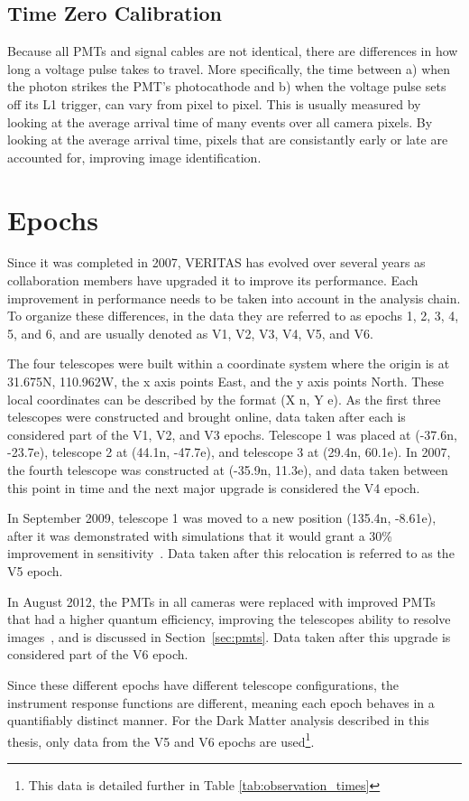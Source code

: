 \subsection{Time Zero Calibration}
Because all PMTs and signal cables are not identical, there are differences in how long a voltage pulse takes to travel.
More specifically, the time between a) when the photon strikes the PMT's photocathode and b) when the voltage pulse sets off its L1 trigger, can vary from pixel to pixel.
This is usually measured by looking at the average arrival time of many events over all camera pixels.
By looking at the average arrival time, pixels that are consistantly early or late are accounted for, improving image identification.

\section{Epochs}\label{sec:epochs}
Since it was completed in 2007, VERITAS has evolved over several years as collaboration members have upgraded it to improve its performance.
Each improvement in performance needs to be taken into account in the analysis chain.
To organize these differences, in the data they are referred to as epochs 1, 2, 3, 4, 5, and 6, and are usually denoted as V1, V2, V3, V4, V5, and V6.

The four telescopes were built within a coordinate system where the origin is at 31.675N, 110.962W, the x axis points East, and the y axis points North.
These local coordinates can be described by the format (X n, Y e).
As the first three telescopes were constructed and brought online, data taken after each is considered part of the V1, V2, and V3 epochs.
Telescope 1 was placed at (-37.6n, -23.7e), telescope 2 at (44.1n, -47.7e), and telescope 3 at (29.4n, 60.1e).
In 2007, the fourth telescope was constructed at (-35.9n, 11.3e), and data taken between this point in time and the next major upgrade is considered the V4 epoch.

In September 2009, telescope 1 was moved to a new position (135.4n, -8.61e), after it was demonstrated with simulations that it would grant a \nicetilde{}30\% improvement in sensitivity~\cite{veritas_t1_move}.
Data taken after this relocation is referred to as the V5 epoch.

In August 2012, the PMTs in all cameras were replaced with improved PMTs that had a higher quantum efficiency, improving the telescopes ability to resolve images~\cite{pmtmodels}, and is discussed in Section~\ref{sec:pmts}.
Data taken after this upgrade is considered part of the V6 epoch.

Since these different epochs have different telescope configurations, the instrument response functions are different, meaning each epoch behaves in a quantifiably distinct manner.
For the Dark Matter analysis described in this thesis, only data from the V5 and V6 epochs are used\footnote{This data is detailed further in Table \ref{tab:observation_times}}.


